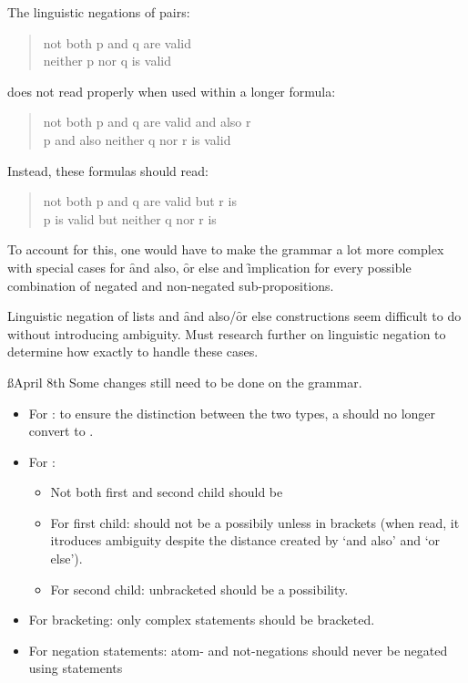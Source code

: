 \documentclass[a4paper]{article}
\begin{document}
The linguistic negations of pairs:
\begin{quote}
not both p and q are valid\\
neither p nor q is valid\\
\end{quote}
does not read properly when used within a longer formula:
\begin{quote}
    not both p and q are valid and also r\\
    p and also neither q nor r is valid\\
\end{quote}
Instead, these formulas should read:
\begin{quote}
    not both p and q are valid but r is\\
    p is valid but neither q nor r is
\end{quote}
To account for this, one would have to make the grammar a lot more complex
with special cases for \f{and also}, \f{or else} and \f{implication} for 
every possible combination of negated and non-negated sub-propositions.

Linguistic negation of lists and \f{and also}/\f{or else} constructions
seem difficult to do without introducing ambiguity.
Must research further on linguistic negation to determine how exactly to 
handle these cases.

\ss{April 8th}
Some changes still need to be done on the grammar.
\begin{itemize}
    \item For : to ensure the distinction between the two
    types, a  should no longer convert to .

    \item For :
        \begin{itemize}
            \item Not both first and second child should be 
            \item For first child:  should not be a possibily unless
            in brackets (when read, it itroduces ambiguity despite the
            distance created by `and also' and `or else').

            \item For second child: unbracketed  should be a
            possibility.
        \end{itemize}

    \item For bracketing: only complex statements should be bracketed.

    \item For negation statements: atom- and not-negations should never be
    negated using statements

\end{itemize}
\end{document}

